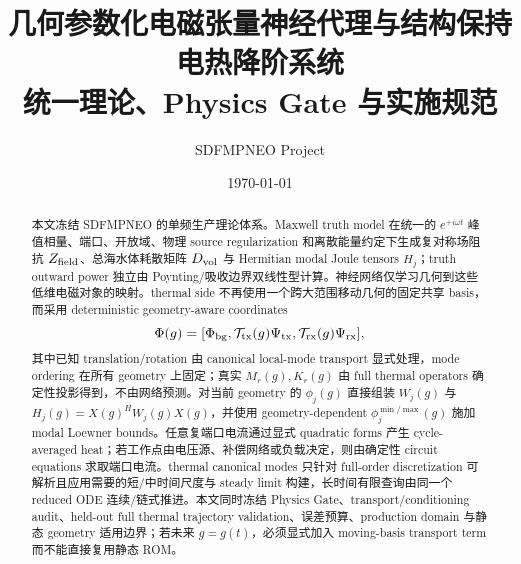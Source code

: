 \documentclass[UTF8,a4paper,11pt]{ctexart}
\title{几何参数化电磁张量神经代理与结构保持电热降阶系统\\
\large 统一理论、Physics Gate 与实施规范}
\author{SDFMPNEO Project}
\date{\today}
\begin{document}
\maketitle

\begin{abstract}
本文冻结 SDFMPNEO 的单频生产理论体系。Maxwell truth model 在统一的 $e^{+i\omega t}$ 峰值相量、端口、开放域、物理 source regularization 和离散能量约定下生成复对称场阻抗 $Z_{\rm field}$、总海水体耗散矩阵 $D_{\rm vol}$ 与 Hermitian modal Joule tensors $H_j$；truth outward power 独立由 Poynting/吸收边界双线性型计算。神经网络仅学习几何到这些低维电磁对象的映射。thermal side 不再使用一个跨大范围移动几何的固定共享 basis，而采用 deterministic geometry-aware coordinates
\[
\Phi(g)=[\Phi_{\rm bg},\mathcal T_{\rm tx}(g)\Psi_{\rm tx},\mathcal T_{\rm rx}(g)\Psi_{\rm rx}],
\]
其中已知 translation/rotation 由 canonical local-mode transport 显式处理，mode ordering 在所有 geometry 上固定；真实 $M_r(g),K_r(g)$ 由 full thermal operators 确定性投影得到，不由网络预测。对当前 geometry 的 $\phi_j(g)$ 直接组装 $W_j(g)$ 与 $H_j(g)=X(g)^HW_j(g)X(g)$，并使用 geometry-dependent $\phi_j^{\min/\max}(g)$ 施加 modal Loewner bounds。任意复端口电流通过显式 quadratic forms 产生 cycle-averaged heat；若工作点由电压源、补偿网络或负载决定，则由确定性 circuit equations 求取端口电流。thermal canonical modes 只针对 full-order discretization 可解析且应用需要的短/中时间尺度与 steady limit 构建，长时间有限查询由同一个 reduced ODE 连续/链式推进。本文同时冻结 Physics Gate、transport/conditioning audit、held-out full thermal trajectory validation、误差预算、production domain 与静态 geometry 适用边界；若未来 $g=g(t)$，必须显式加入 moving-basis transport term而不能直接复用静态 ROM。
\end{abstract}

\tableofcontents
\clearpage












\appendix

\end{document}
